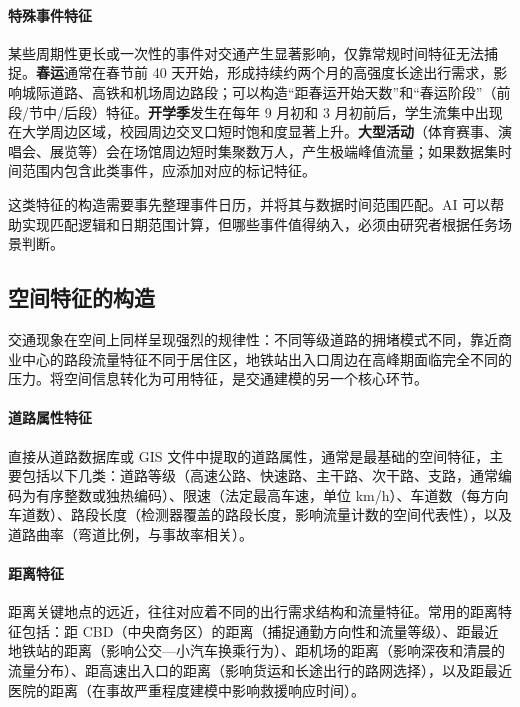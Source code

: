 \paragraph{特殊事件特征}

某些周期性更长或一次性的事件对交通产生显著影响，仅靠常规时间特征无法捕捉。\textbf{春运}通常在春节前 40 天开始，形成持续约两个月的高强度长途出行需求，影响城际道路、高铁和机场周边路段；可以构造“距春运开始天数”和“春运阶段”（前段/节中/后段）特征。\textbf{开学季}发生在每年 9 月初和 3 月初前后，学生流集中出现在大学周边区域，校园周边交叉口短时饱和度显著上升。\textbf{大型活动}（体育赛事、演唱会、展览等）会在场馆周边短时集聚数万人，产生极端峰值流量；如果数据集时间范围内包含此类事件，应添加对应的标记特征。

这类特征的构造需要事先整理事件日历，并将其与数据时间范围匹配。AI 可以帮助实现匹配逻辑和日期范围计算，但哪些事件值得纳入，必须由研究者根据任务场景判断。

\subsection{空间特征的构造}

交通现象在空间上同样呈现强烈的规律性：不同等级道路的拥堵模式不同，靠近商业中心的路段流量特征不同于居住区，地铁站出入口周边在高峰期面临完全不同的压力。将空间信息转化为可用特征，是交通建模的另一个核心环节。

\paragraph{道路属性特征}

直接从道路数据库或 GIS 文件中提取的道路属性，通常是最基础的空间特征，主要包括以下几类：道路等级（高速公路、快速路、主干路、次干路、支路，通常编码为有序整数或独热编码）、限速（法定最高车速，单位 km/h）、车道数（每方向车道数）、路段长度（检测器覆盖的路段长度，影响流量计数的空间代表性），以及道路曲率（弯道比例，与事故率相关）。

\paragraph{距离特征}

距离关键地点的远近，往往对应着不同的出行需求结构和流量特征。常用的距离特征包括：距 CBD（中央商务区）的距离（捕捉通勤方向性和流量等级）、距最近地铁站的距离（影响公交—小汽车换乘行为）、距机场的距离（影响深夜和清晨的流量分布）、距高速出入口的距离（影响货运和长途出行的路网选择），以及距最近医院的距离（在事故严重程度建模中影响救援响应时间）。

